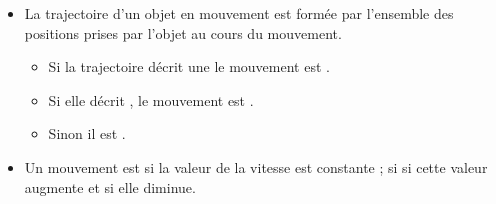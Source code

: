 \begin{mybilan}
	\begin{itemize}
		
		\item La trajectoire d'un objet en mouvement est formée par l'ensemble des positions prises par l'objet au cours du mouvement.
		
		\begin{itemize}
			\item Si la trajectoire décrit une  le mouvement est .
			\item Si elle décrit , le mouvement est .
			\item Sinon il est .
		\end{itemize}
	
		\item Un mouvement est  si la valeur de la vitesse est constante ;  si si cette valeur augmente et  si elle diminue. 
		
	\end{itemize}
\end{mybilan}